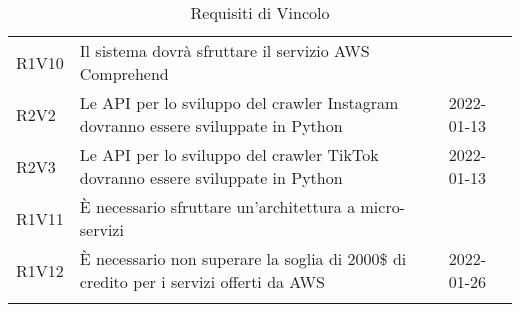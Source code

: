 \begin{longtable}{ m{}<{\centering}  m{}<{\centering}  m{}<{\centering}  m{}<{\centering}}
	R1V10 & Il sistema dovrà sfruttare il servizio AWS Comprehend & \Ob & \Ca \\	 

	R2V2 & Le API per lo sviluppo del crawler Instagram dovranno essere sviluppate in Python & \De & \Vi{} 2022-01-13 \\	
	 
	R2V3 & Le API per lo sviluppo del crawler TikTok dovranno essere sviluppate in Python & \De & \Vi{} 2022-01-13 \\	
	 
	R1V11 & È necessario sfruttare un’architettura a micro-servizi & \Ob & \Ca \\	
	 
	R1V12 & È necessario non superare la soglia di 2000\$ di credito per i servizi offerti da AWS & \Ob & \Ve{} 2022-01-26 \\	
	
	\hiderowcolors \caption{Requisiti di Vincolo}
\end{longtable}

\pagebreak